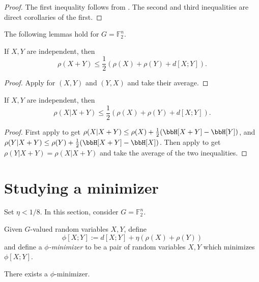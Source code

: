 \begin{proof}\leanok
  The first inequality follows from . The second and third inequalities are direct corollaries of the first.
\end{proof}

The following lemmas hold for $G=\mathbb{F}_2^n$.

\begin{lemma}\label{rho-sums-sym}\leanok  If $X,Y$ are independent, then
  $$ \rho(X+Y) \leq \frac{1}{2}(\rho(X)+\rho(Y) + d[X;Y]).$$
\end{lemma}
\begin{proof}\leanok
Apply  for $(X,Y)$ and $(Y,X)$ and take their average.
\end{proof}

\begin{lemma}\label{rho-cond-sym}\leanok
  If $X,Y$ are independent, then
  $$ \rho(X | X+Y) \leq \frac{1}{2}(\rho(X)+\rho(Y) + d[X;Y]).$$
\end{lemma}
\begin{proof}\leanok
  First apply  to get $\rho(X|X+Y)\le \rho(X) + \frac{1}{2}(\bbH[X+Y]-\bbH[Y])$, and $\rho(Y|X+Y)\le \rho(Y)+\frac{1}{2}(\bbH[X+Y]-\bbH[X])$. Then apply  to get $\rho(Y|X+Y)=\rho(X|X+Y)$ and take the average of the two inequalities.
\end{proof}

\section{Studying a minimizer}

Set $\eta < 1/8$. In this section, consider $G=\mathbb{F}_2^n$.

\begin{definition}\label{phi-min-def}\leanok  Given $G$-valued random variables $X,Y$, define
$$ \phi[X;Y] := d[X;Y] + \eta(\rho(X) + \rho(Y))$$
and define a \emph{$\phi$-minimizer} to be a pair of random variables $X,Y$ which minimizes $\phi[X;Y]$.
\end{definition}

\begin{lemma}\label{phi-min-exist}\leanok  There exists a $\phi$-minimizer.
\end{lemma}

